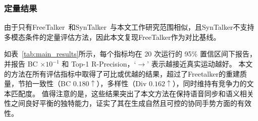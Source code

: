 \subsubsection{定量结果}
由于只有FreeTalker~\cite{yang2024freetalker}和SynTalker~\cite{chen2024syntalker}与本文工作研究范围相似，且SynTalker不支持多模态条件的定量评估方法，因此本文复现FreeTalker作为对比基线。

如表~\ref{tab:main_results}所示，每个指标均在 20 次运行的 95\% 置信区间下报告，并报告 BC $\times 10^{-1}$ 和 Top-1 R-Precision，`$\rightarrow$' 表示越接近真实运动越好。
本文的方法在所有评估指标中取得了可比或优越的结果，超过了Freetalker的重建质量，节拍一致性（BC $0.180\uparrow$），多样性（Div $0.162\uparrow$），同时维持有竞争力的文本匹配度。
值得注意的是，这些结果突出了本文方法在保持语音同步和语义相关性之间良好平衡的独特能力，证实了其在生成自然且可控的协同手势方面的有效性。



